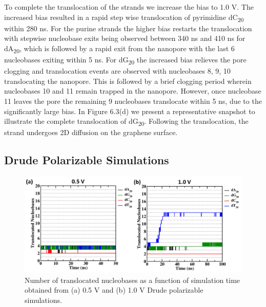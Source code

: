 To complete the translocation of the strands we increase the bias to 1.0 V. The increased bias resulted in a rapid step wise translocation of pyrimidine dC\textsubscript{20} within 280 ns. For the purine strands the higher bias restarts the translocation with stepwise nucleobase exits being observed between 340 ns and 410 ns for dA\textsubscript{20}, which is followed by a rapid exit from the nanopore with the last 6 nucleobases exiting within 5 ns. For dG\textsubscript{20} the increased bias relieves the pore clogging and translocation events are observed with nucleobases 8, 9, 10 translocating the nanopore. This is followed by a brief clogging period wherein nucleobases 10 and 11 remain trapped in the nanopore. However, once nucleobase 11 leaves the pore the remaining 9 nucleobases translocate within 5 ns, due to the significantly large bias. In Figure 6.3(d) we present a representative snapshot to illustrate the complete translocation of dG\textsubscript{20}. Following the translocation, the strand undergoes 2D diffusion on the graphene surface. 

\subsection{Drude Polarizable Simulations}
\begin{figure}
    \centering
    \includegraphics[width=\textwidth]{Chapter4/Figures/Figure12.png}
    \caption[Number of translocated nucleobases as a function of simulation time obtained from (a) 0.5 V and (b) 1.0 V Drude polarizable simulations.]{Number of translocated nucleobases as a function of simulation time obtained from (a) 0.5 V and (b) 1.0 V Drude polarizable simulations.}
\end{figure}

